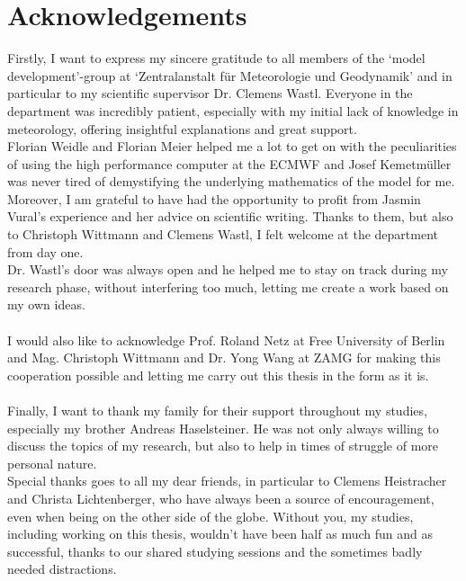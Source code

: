

\section*{Acknowledgements}
Firstly, I want to express my sincere gratitude to all members of the  `model development'-group at `Zentralanstalt f\"ur Meteorologie und Geodynamik' and in particular to my scientific supervisor Dr. Clemens Wastl. Everyone in the department  was incredibly patient, especially with my initial lack of knowledge in meteorology, offering insightful explanations and great support. \\
Florian Weidle and Florian Meier helped me a lot to get on with the peculiarities of using the high performance computer at the ECMWF and Josef Kemetmüller was never tired of demystifying the underlying mathematics of the model for me. Moreover, I am grateful to have had the opportunity to profit from Jasmin Vural's experience and her advice on scientific writing. Thanks to them, but also to Christoph Wittmann and Clemens Wastl, I felt welcome at the department from day one.\\
Dr. Wastl's door was always open and he helped me to stay on track during my research phase, without interfering too much, letting me create a work based on my own ideas.\\ \\
I would also like to acknowledge Prof. Roland Netz at Free University of Berlin and Mag. Christoph Wittmann and Dr. Yong Wang at ZAMG for making this cooperation possible and letting me carry out this thesis in the form as it is.\\ \\
Finally, I want to thank my family for their support throughout my studies, especially my brother Andreas Haselsteiner. He was not only always willing to discuss the topics of my research, but also to help in times of struggle of more personal nature.\\
Special thanks goes to all my dear friends, in particular to Clemens Heistracher and Christa Lichtenberger, who have always been a source of encouragement, even when being on the other side of the globe.
Without you, my studies, including working on this thesis, wouldn't have been half as much fun and as successful, thanks to our shared studying sessions and the sometimes badly needed distractions.
